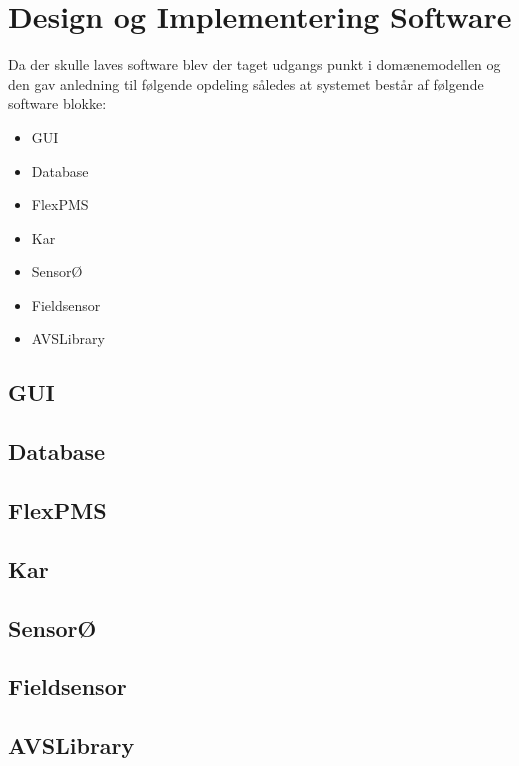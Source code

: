 \section{Design og Implementering Software}
Da der skulle laves software blev der taget udgangs punkt i domænemodellen og den gav anledning til følgende opdeling således at
systemet består af følgende software blokke:
\begin{itemize}
\item GUI
\item Database
\item FlexPMS
\item Kar
\item SensorØ
\item Fieldsensor
\item AVSLibrary
\end{itemize}

\subsection{GUI}

\subsection{Database}

\subsection{FlexPMS}

\subsection{Kar}

\subsection{SensorØ}

\subsection{Fieldsensor}

\subsection{AVSLibrary}
